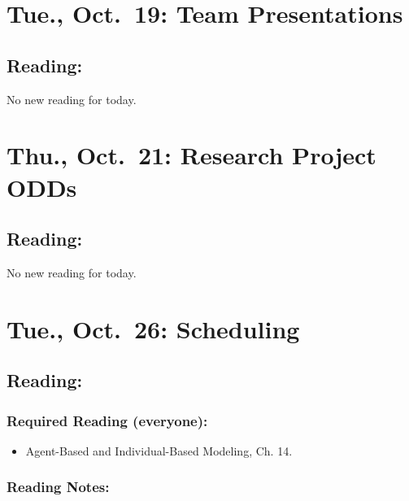 \documentclass[
]{article}
\providecommand{\tightlist}{%
  \setlength{\itemsep}{0pt}\setlength{\parskip}{0pt}}
\begin{document}
\hypertarget{tue.-oct.-19-team-presentations}{%
\section{Tue., Oct.~19: Team
Presentations}\label{tue.-oct.-19-team-presentations}}

\hypertarget{reading-14}{%
\subsection{Reading:}\label{reading-14}}

No new reading for today.

\hypertarget{thu.-oct.-21-research-project-odds}{%
\section{Thu., Oct.~21: Research Project
ODDs}\label{thu.-oct.-21-research-project-odds}}

\hypertarget{reading-15}{%
\subsection{Reading:}\label{reading-15}}

No new reading for today.

\hypertarget{tue.-oct.-26-scheduling}{%
\section{Tue., Oct.~26: Scheduling}\label{tue.-oct.-26-scheduling}}

\hypertarget{reading-16}{%
\subsection{Reading:}\label{reading-16}}

\hypertarget{required-reading-everyone-13}{%
\subsubsection{Required Reading
(everyone):}\label{required-reading-everyone-13}}

\begin{itemize}
\tightlist
\item
  Agent-Based and Individual-Based Modeling, Ch. 14.
\end{itemize}

\hypertarget{reading-notes-12}{%
\subsubsection{Reading Notes:}\label{reading-notes-12}}
\end{document}
